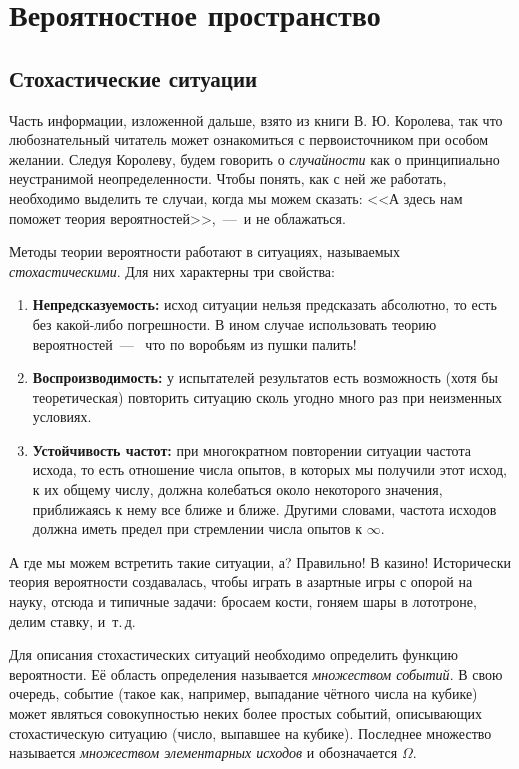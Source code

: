\documentclass[../TV&MS.tex]{subfiles}
\begin{document}
\section{Вероятностное пространство}

\subsection{Стохастические ситуации}

\qquad Часть информации, изложенной дальше, взято из книги \cite{Korolev} В. Ю. Королева, 
так что любознательный читатель может ознакомиться с первоисточником при особом желании.
Следуя Королеву, будем говорить о \textit{случайности} как о принципиально
неустранимой неопределенности. Чтобы понять, как с ней же работать, необходимо
выделить те случаи, когда мы можем сказать: <<А здесь нам поможет теория вероятностей>>,~---~и не облажаться.

Методы теории вероятности работают в ситуациях, называемых \textit{стохастическими}. 
Для них характерны три свойства:
\begin{enumerate}[label={\bfseries \ding{118}\quad\arabic{enumi}:},leftmargin=*]
	\item \textbf{Непредсказуемость:} исход ситуации нельзя предсказать абсолютно, то
	есть без какой-либо погрешности. В ином случае использовать теорию вероятностей~---~ 
	что по воробьям из пушки палить!
	
	\item \textbf{Воспроизводимость:} у испытателей результатов есть возможность (хотя бы 
	теоретическая) повторить ситуацию сколь угодно много раз при неизменных условиях.
	
	\item \textbf{Устойчивость частот:} при многократном повторении ситуации частота исхода,
	то есть отношение числа опытов, в которых мы получили этот исход, к их общему числу,
	должна колебаться около некоторого значения, приближаясь к нему все ближе и ближе.
	Другими словами, частота исходов должна иметь предел при стремлении
	числа опытов к $\infty$.
\end{enumerate}

А где мы можем встретить такие ситуации, а? Правильно! В казино!
Исторически теория вероятности создавалась, чтобы играть в азартные игры с опорой на науку, отсюда и типичные задачи: бросаем кости, гоняем шары в лототроне, делим ставку, и~т.\,д.

Для описания стохастических ситуаций необходимо определить функцию вероятности. 
Её область определения называется \textit{множеством событий}. В свою очередь, событие 
(такое как, например, выпадание чётного числа на кубике) может являться совокупностью неких 
более простых событий, описывающих стохастическую ситуацию (число, выпавшее на кубике). 
Последнее множество называется \textit{множеством элементарных исходов} и обозначается $\Omega$.  
\end{document}

